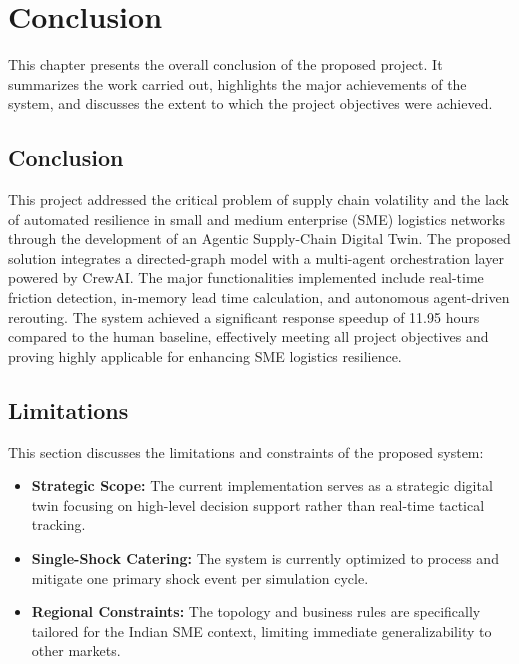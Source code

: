 \chapter[Conclusion]{Conclusion}
This chapter presents the overall conclusion of the proposed project. It summarizes the work
carried out, highlights the major achievements of the system, and discusses the extent to
which the project objectives were achieved.

\section[Conclusion]{Conclusion}
This project addressed the critical problem of supply chain volatility and the lack of automated resilience in small and medium enterprise (SME) logistics networks through the development of an Agentic Supply-Chain Digital Twin. The proposed solution integrates a directed-graph model with a multi-agent orchestration layer powered by CrewAI. The major functionalities implemented include real-time friction detection, in-memory lead time calculation, and autonomous agent-driven rerouting. The system achieved a significant response speedup of 11.95 hours compared to the human baseline, effectively meeting all project objectives and proving highly applicable for enhancing SME logistics resilience.

\section[Limitations]{Limitations}
This section discusses the limitations and constraints of the proposed system:
\begin{itemize}
    \item \textbf{Strategic Scope:} The current implementation serves as a strategic digital twin focusing on high-level decision support rather than real-time tactical tracking.
    \item \textbf{Single-Shock Catering:} The system is currently optimized to process and mitigate one primary shock event per simulation cycle.
    \item \textbf{Regional Constraints:} The topology and business rules are specifically tailored for the Indian SME context, limiting immediate generalizability to other markets.
\end{itemize}

